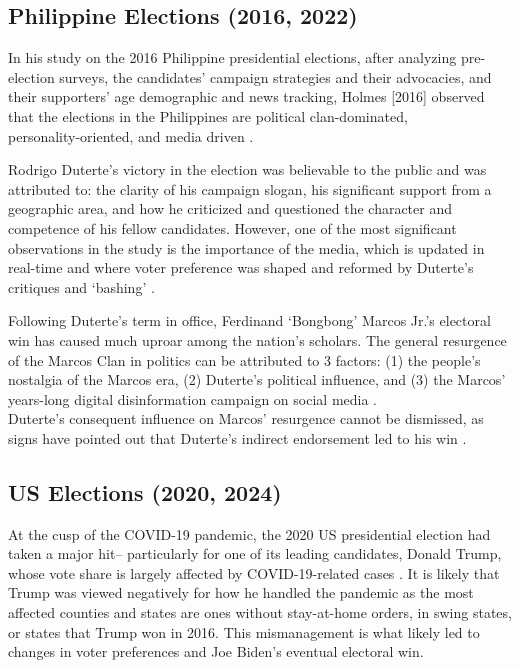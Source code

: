 \subsection{Philippine Elections (2016, 2022)}
In his study on the 2016 Philippine presidential elections, after analyzing pre-election surveys, the candidates' campaign strategies and their advocacies, and their supporters' age demographic and news tracking, Holmes [2016] observed that the elections in the Philippines are political clan-dominated, \\personality-oriented, and media driven \cite{RRL_Holmes-2016}.

Rodrigo Duterte's victory in the election was believable to the public and was attributed to: the clarity of his campaign slogan, his significant support from a geographic area, and how he criticized and questioned the character and competence of his fellow candidates. However, one of the most significant observations in the study is the importance of the media, which is updated in real-time and where voter preference was shaped and reformed by Duterte’s critiques and ‘bashing’ \cite{RRL_Holmes-2016}.

Following Duterte’s term in office, Ferdinand ‘Bongbong’ Marcos Jr.’s electoral win has caused much uproar among the nation’s scholars. The general resurgence of the Marcos Clan in politics can be attributed to 3 factors: (1) the people’s nostalgia of the Marcos era, (2) Duterte’s political influence, and (3) the Marcos’ years-long digital disinformation campaign on social media \cite{RRL_Pernia-2025}. \\Duterte’s consequent influence on Marcos’ resurgence cannot be dismissed, as signs have pointed out that Duterte’s indirect endorsement led to his win \cite{RRL_Dulay-2023}.

\subsection{US Elections (2020, 2024)}
At the cusp of the COVID-19 pandemic, the 2020 US presidential election had taken a major hit– particularly for one of its leading candidates, Donald Trump, whose vote share is largely affected by COVID-19-related cases \cite{RRL_Baccini-2021}. It is likely that Trump was viewed negatively for how he handled the pandemic as the most affected counties and states are ones without stay-at-home orders, in swing states, or states that Trump won in 2016. This mismanagement is what likely led to changes in voter preferences and Joe Biden’s eventual electoral win.

